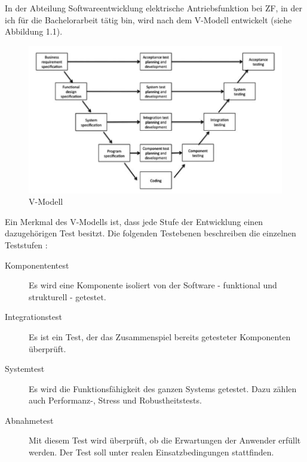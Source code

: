 In der Abteilung Softwareentwicklung elektrische Antriebsfunktion bei ZF, in der ich für die Bachelorarbeit tätig bin,
wird nach dem V-Modell entwickelt (siehe Abbildung 1.1).\par
\begin{figure}[h]
\centering
\includegraphics[scale=1.2,]{Bilder/VModell.png}
\caption{V-Modell \cite[S. 68]{agiletesting}}\label{fig:VModell}
\end{figure}
Ein Merkmal des V-Modells ist, dass jede Stufe der Entwicklung einen dazugehörigen Test besitzt.
Die folgenden Testebenen beschreiben die einzelnen Teststufen \cite[vgl.][S. 41 f., S. 51]{integration}:
\begin{description}
\item[Komponententest] Es wird eine Komponente isoliert von der Software - funktional und strukturell - getestet. %
\item[Integrationstest] Es ist ein Test, der das Zusammenspiel bereits getesteter Komponenten überprüft. %
\item[Systemtest] Es wird die Funktionsfähigkeit des ganzen Systems getestet. Dazu zählen auch Performanz-, Stress und Robustheitstests.
\item[Abnahmetest] Mit diesem Test wird überprüft, ob die Erwartungen der Anwender erfüllt werden. Der Test soll
unter realen Einsatzbedingungen stattfinden.
\end{description}
